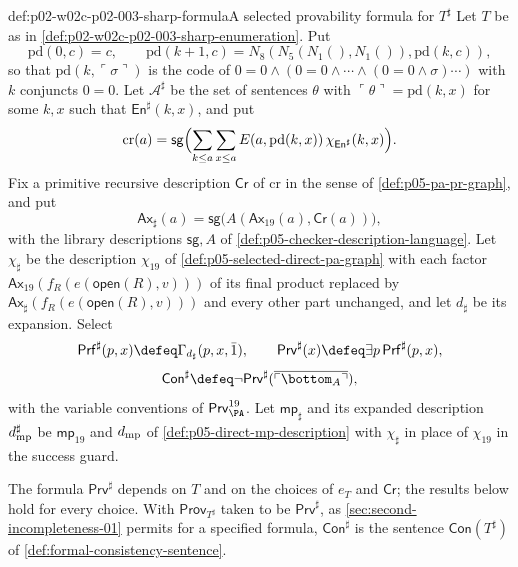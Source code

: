 \begin{hbdefinition}{def:p02-w02c-p02-003-sharp-formula}{A selected provability formula for \(T^{\sharp}\)}
Let \(T\) be as in \cref{def:p02-w02c-p02-003-sharp-enumeration}.  Put
\[
 \mathrm{pd}(0,c)=c,\qquad
 \mathrm{pd}(k+1,c)=N_8(N_5(N_1(),N_1()),\mathrm{pd}(k,c)),
\]
so that
\(\mathrm{pd}(k,\ulcorner\sigma\urcorner)\) is the code of
\(0=0\land(0=0\land\cdots\land(0=0\land\sigma)\cdots)\) with \(k\)
conjuncts \(0=0\).  Let \(\mathcal A^{\sharp}\) be the set of sentences
\(\theta\) with \(\ulcorner\theta\urcorner=\mathrm{pd}(k,x)\) for some
\(k,x\) such that \(\mathsf{En}^{\sharp}(k,x)\), and put
\[
 \mathrm{cr}(a)=\mathsf{sg}\Bigl(\sum_{k\le a}\sum_{x\le a}
     E(a,\mathrm{pd}(k,x))\,\chi_{\mathsf{En}^{\sharp}}(k,x)\Bigr).
\]
Fix a primitive recursive description \(\mathsf{Cr}\) of \(\mathrm{cr}\)
in the sense of \cref{def:p05-pa-pr-graph}, and put
\[
 \mathsf{Ax}_{\sharp}(a)=\mathsf{sg}\bigl(A(\mathsf{Ax}_{19}(a),
 \mathsf{Cr}(a))\bigr),
\]
with the library descriptions \(\mathsf{sg},A\) of
\cref{def:p05-checker-description-language}.  Let \(\chi_{\sharp}\) be the
description \(\chi_{19}\) of \cref{def:p05-selected-direct-pa-graph} with
each factor \(\mathsf{Ax}_{19}(f_R(e(\mathsf{open}(R),v)))\) of its final
product replaced by \(\mathsf{Ax}_{\sharp}(f_R(e(\mathsf{open}(R),v)))\)
and every other part unchanged, and let \(d_{\sharp}\) be its expansion.
Select
\[
 \mathsf{Prf}^{\sharp}(p,x)\defeq\Gamma_{d_{\sharp}}(p,x,\bar1),\qquad
 \mathsf{Prv}^{\sharp}(x)\defeq\exists p\,\mathsf{Prf}^{\sharp}(p,x),
\]
\[
 \mathsf{Con}^{\sharp}\defeq\neg\mathsf{Prv}^{\sharp}
       (\overline{\ulcorner\bottom_A\urcorner}),
\]
with the variable conventions of \(\mathsf{Prv}^{19}_{\PA}\).  Let
\(\mathsf{mp}_{\sharp}\) and its expanded description
\(d^{\sharp}_{\rm mp}\) be \(\mathsf{mp}_{19}\) and \(d_{\rm mp}\) of
\cref{def:p05-direct-mp-description} with \(\chi_{\sharp}\) in place of
\(\chi_{19}\) in the success guard.
\end{hbdefinition}

The formula \(\mathsf{Prv}^{\sharp}\) depends on \(T\) and on the choices of
\(e_T\) and \(\mathsf{Cr}\); the results below hold for every choice.  With
\(\mathsf{Prov}_{T^{\sharp}}\) taken to be \(\mathsf{Prv}^{\sharp}\), as
\cref{sec:second-incompleteness-01} permits for a specified formula,
\(\mathsf{Con}^{\sharp}\) is the sentence \(\mathsf{Con}(T^{\sharp})\) of
\cref{def:formal-consistency-sentence}.

